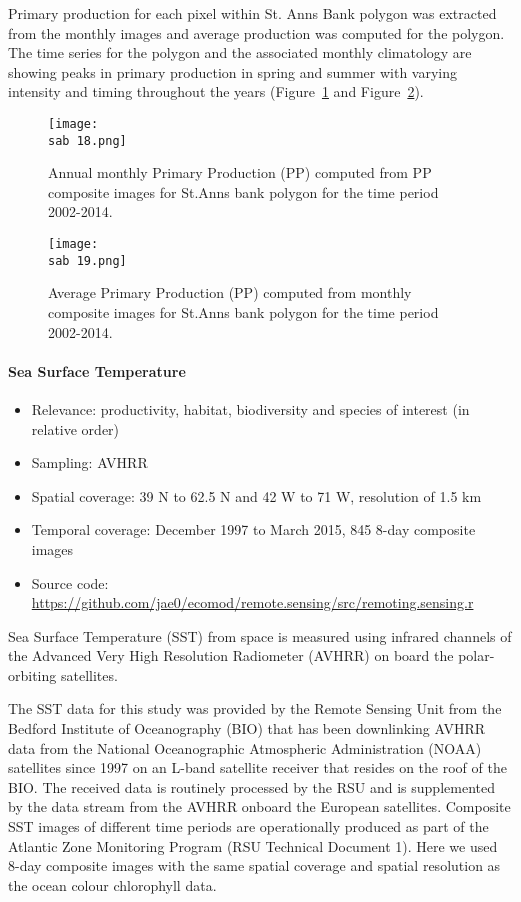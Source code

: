 \documentclass[letterpaper,portrait,11pt]{scrartcl}
\numberwithin{equation}{section}		%
\numberwithin{figure}{section}			%
\numberwithin{table}{section}				%
\newcommand{\ecomod}{\string~/ecomod_data/}   %
\newcommand{\sab}{\ecomod/mpa/sab/}   %
\begin{document}
Primary production for each pixel within St. Anns Bank polygon was extracted from the monthly images and average production was computed for the polygon. The time series for the polygon and the associated monthly climatology are showing peaks in primary production in spring and summer with varying intensity and timing throughout the years (Figure~\ref{fig:ppTSmonthly} and Figure~\ref{fig:ppTSannual}). 


\begin{figure}[h]
  \label{fig:ppTSmonthly}
  \centering
  \texttt{[image: \\sab 18.png]}
  \caption{Annual monthly Primary Production (PP) computed from PP composite images for St.Anns bank polygon for the time period 2002-2014.}
\end{figure}


\begin{figure}[h]
  \label{fig:ppTSannual}
  \centering
  \texttt{[image: \\sab 19.png]}
  \caption{Average Primary Production (PP) computed from monthly composite images for St.Anns bank polygon for the time period 2002-2014.}
\end{figure}

\clearpage

\paragraph{Sea Surface Temperature}


\begin{itemize}
  \item Relevance:  productivity, habitat, biodiversity and species of interest (in relative order)
  \item Sampling:  AVHRR
  \item Spatial coverage: 39 N to 62.5 N and 42 W to 71 W, resolution of 1.5 km
  \item Temporal coverage: December 1997 to March 2015, 845 8-day composite images
  \item Source code: \url{https://github.com/jae0/ecomod/remote.sensing/src/remoting.sensing.r}
\end{itemize}

Sea Surface Temperature (SST) from space is measured using infrared channels of the Advanced Very High Resolution Radiometer (AVHRR) on board the polar-orbiting satellites.

The SST data for this study was provided by the Remote Sensing Unit from the Bedford Institute of Oceanography (BIO) that has been downlinking AVHRR data from the National Oceanographic Atmospheric Administration (NOAA) satellites since 1997 on an L-band satellite receiver that resides on the roof of the BIO. The received data is routinely processed by the RSU and is supplemented by the data stream from the AVHRR onboard the European satellites. Composite SST images of different time periods are operationally produced as part of the Atlantic Zone Monitoring Program (RSU Technical Document 1). Here we used 8-day composite images with the same spatial coverage and spatial resolution as the ocean colour chlorophyll data.
\end{document}
